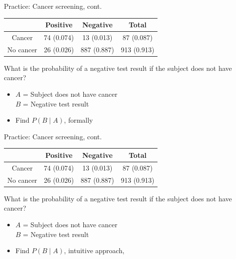 \documentclass[xcolor=table, aspectratio=169, bigger, handout]{beamer}
\begin{document}
\begin{frame}{Practice: Cancer screening, cont.}
\begin{block}{}
{\centering \renewcommand{\arraystretch}{1}
\begin{tabular}{c | c  c | c}
 & Positive & Negative & Total \\
\hline
Cancer & 74 (0.074) & 13 (0.013) & 87 (0.087)\\
No cancer & 26 (0.026) & 887 (0.887) & 913 (0.913)\\
\end{tabular}\par
\renewcommand{\arraystretch}{1.5}
}
\end{block}

\begin{exampleblock}{}
What is the probability of a negative test result if the subject does not have cancer?
\begin{itemize}
\pause
\item $A$ = Subject does not have cancer\\
$B$ = Negative test result
\pause
\item Find $P(B \mid A)$, formally\\ \smallskip
{}
\end{itemize}
\end{exampleblock}
\end{frame}

\begin{frame}{Practice: Cancer screening, cont.}
\begin{block}{}
{\centering \renewcommand{\arraystretch}{1}
\begin{tabular}{c | c  c | c}
 & Positive & Negative & Total \\
\hline
Cancer & 74 (0.074) & 13 (0.013) & 87 (0.087)\\
No cancer & 26 (0.026) & 887 (0.887) & 913 (0.913)\\
\end{tabular}\par
\renewcommand{\arraystretch}{1.5}
}
\end{block}

\begin{exampleblock}{}
What is the probability of a negative test result if the subject does not have cancer?
\begin{itemize}
\item $A$ = Subject does not have cancer\\
$B$ = Negative test result
\item Find $P(B \mid A)$, intuitive approach, \\ \smallskip
{}
\end{itemize}
\end{exampleblock}
\end{frame}
\end{document}
